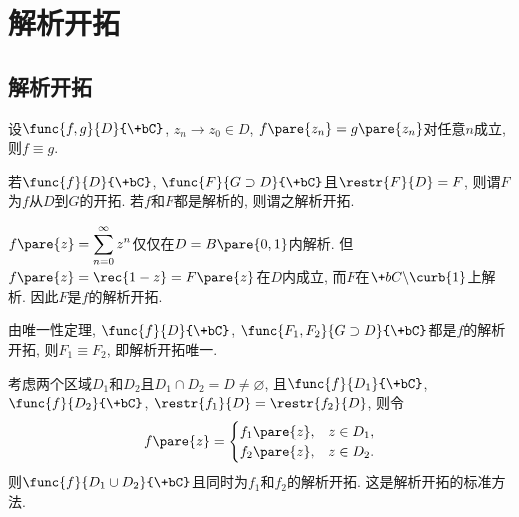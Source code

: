 \documentclass{ctexart}
\begin{document}
\section{解析开拓} %
\label{sec:解析开拓}

\subsection{解析开拓} %
\label{sub:解析开拓}

\begin{theorem}[唯一性定理]
    设$\func{f,g}{D}{\+bC}$, $z_n\rightarrow z_0\in D$, $f\pare{z_n} = g\pare{z_n}$对任意$n$成立, 则$f\equiv g$.
\end{theorem}
\begin{definition}
    若$\func{f}{D}{\+bC}$, $\func{F}{G\supset D}{\+bC}$且$\restr{F}{D} = F$, 则谓$F$为$f$从$D$到$G$的开拓. 若$f$和$F$都是解析的, 则谓之解析开拓.
\end{definition}
\begin{sample}
    \begin{ex}
        $f\pare{z} = \displaystyle \sum_{n=0}^\infty z^n$仅仅在$D=B\pare{0,1}$内解析. 但$f\pare{z} = \displaystyle \rec{1-z} = F\pare{z}$在$D$内成立, 而$F$在$\+bC\backslash\curb{1}$上解析. 因此$F$是$f$的解析开拓.
    \end{ex}
\end{sample}
\begin{remark}
    由唯一性定理, $\func{f}{D}{\+bC}$, $\func{F_1,F_2}{G\supset D}{\+bC}$都是$f$的解析开拓, 则$F_1\equiv F_2$, 即解析开拓唯一.
\end{remark}
\begin{figure}[ht]
    \centering
    \begin{subfigure}{5cm}
        \centering
    \end{subfigure}
    \begin{subfigure}{5cm}
        \centering
    \end{subfigure}
\end{figure}
考虑两个区域$D_1$和$D_2$且$D_1\cap D_2 = D \neq \varnothing$, 且$\func{f}{D_1}{\+bC}$, $\func{f}{D_2}{\+bC}$, $\restr{f_1}{D} = \restr{f_2}{D}$, 则令
\[ f\pare{z} = \begin{cases}
    f_1\pare{z},& z\in D_1, \\
    f_2\pare{z},& z\in D_2.
\end{cases} \]
则$\func{f}{D_1\cup D_2}{\+bC}$且同时为$f_1$和$f_2$的解析开拓. 这是解析开拓的标准方法.
\end{document}
